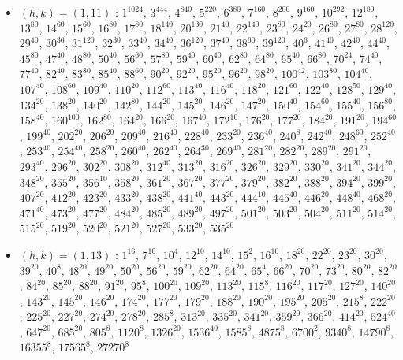 \begin{itemize}
\item $(h,k)=(1,11)$ : $1^{1024}$, $3^{444}$, $4^{840}$, $5^{220}$, $6^{380}$, $7^{160}$, $8^{200}$, $9^{160}$, $10^{292}$, $12^{180}$, $13^{80}$, $14^{60}$, $15^{60}$, $16^{80}$, $17^{80}$, $18^{140}$, $20^{130}$, $21^{40}$, $22^{140}$, $23^{80}$, $24^{20}$, $26^{80}$, $27^{80}$, $28^{120}$, $29^{40}$, $30^{36}$, $31^{120}$, $32^{30}$, $33^{40}$, $34^{40}$, $36^{120}$, $37^{40}$, $38^{60}$, $39^{120}$, $40^{6}$, $41^{40}$, $42^{40}$, $44^{40}$, $45^{80}$, $47^{40}$, $48^{80}$, $50^{40}$, $56^{60}$, $57^{80}$, $59^{40}$, $60^{40}$, $62^{80}$, $64^{80}$, $65^{40}$, $66^{80}$, $70^{24}$, $74^{40}$, $77^{40}$, $82^{40}$, $83^{80}$, $85^{40}$, $88^{60}$, $90^{20}$, $92^{20}$, $95^{20}$, $96^{20}$, $98^{20}$, $100^{42}$, $103^{80}$, $104^{40}$, $107^{40}$, $108^{60}$, $109^{40}$, $110^{20}$, $112^{60}$, $113^{40}$, $116^{40}$, $118^{20}$, $121^{60}$, $122^{40}$, $128^{50}$, $129^{40}$, $134^{20}$, $138^{20}$, $140^{20}$, $142^{80}$, $144^{20}$, $145^{20}$, $146^{20}$, $147^{20}$, $150^{40}$, $154^{60}$, $155^{40}$, $156^{80}$, $158^{40}$, $160^{100}$, $162^{80}$, $164^{20}$, $166^{20}$, $167^{40}$, $172^{10}$, $176^{20}$, $177^{20}$, $184^{20}$, $191^{20}$, $194^{60}$, $199^{40}$, $202^{20}$, $206^{20}$, $209^{40}$, $216^{40}$, $228^{40}$, $233^{20}$, $236^{40}$, $240^{8}$, $242^{40}$, $248^{60}$, $252^{40}$, $253^{40}$, $254^{40}$, $258^{20}$, $260^{40}$, $262^{40}$, $264^{30}$, $269^{40}$, $281^{20}$, $282^{20}$, $289^{20}$, $291^{20}$, $293^{40}$, $296^{20}$, $302^{20}$, $308^{20}$, $312^{40}$, $313^{20}$, $316^{20}$, $326^{20}$, $329^{20}$, $330^{20}$, $341^{20}$, $344^{20}$, $348^{20}$, $355^{20}$, $356^{10}$, $358^{20}$, $361^{20}$, $367^{20}$, $377^{20}$, $379^{20}$, $382^{20}$, $388^{20}$, $394^{20}$, $399^{20}$, $407^{20}$, $412^{20}$, $423^{20}$, $433^{20}$, $438^{20}$, $441^{40}$, $443^{20}$, $444^{10}$, $445^{40}$, $446^{20}$, $448^{40}$, $468^{20}$, $471^{40}$, $473^{20}$, $477^{20}$, $484^{20}$, $485^{20}$, $489^{20}$, $497^{20}$, $501^{20}$, $503^{20}$, $504^{20}$, $511^{20}$, $514^{20}$, $515^{20}$, $519^{20}$, $520^{20}$, $521^{20}$, $527^{20}$, $533^{20}$, $535^{20}$
\item $(h,k)=(1,13)$ : $1^{16}$, $7^{10}$, $10^{4}$, $12^{10}$, $14^{10}$, $15^{2}$, $16^{10}$, $18^{20}$, $22^{20}$, $23^{20}$, $30^{20}$, $39^{20}$, $40^{8}$, $48^{20}$, $49^{20}$, $50^{20}$, $56^{20}$, $59^{20}$, $62^{20}$, $64^{20}$, $65^{4}$, $66^{20}$, $70^{20}$, $73^{20}$, $80^{20}$, $82^{20}$, $84^{20}$, $85^{20}$, $88^{20}$, $91^{20}$, $95^{8}$, $100^{20}$, $109^{20}$, $113^{20}$, $115^{8}$, $116^{20}$, $117^{20}$, $127^{20}$, $140^{20}$, $143^{20}$, $145^{20}$, $146^{20}$, $174^{20}$, $177^{20}$, $179^{20}$, $188^{20}$, $190^{20}$, $195^{20}$, $205^{20}$, $215^{8}$, $222^{20}$, $225^{20}$, $227^{20}$, $274^{20}$, $278^{20}$, $285^{8}$, $313^{20}$, $335^{20}$, $341^{20}$, $359^{20}$, $366^{20}$, $414^{20}$, $524^{40}$, $647^{20}$, $685^{20}$, $805^{8}$, $1120^{8}$, $1326^{20}$, $1536^{40}$, $1585^{8}$, $4875^{8}$, $6700^{2}$, $9340^{8}$, $14790^{8}$, $16355^{8}$, $17565^{8}$, $27270^{8}$

\end{itemize}
